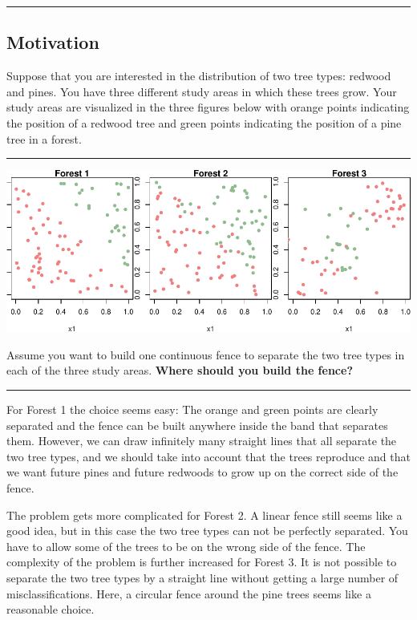 \documentclass[]{article}
\begin{document}
\begin{center}\rule{0.5\linewidth}{\linethickness}\end{center}

\hypertarget{motivation}{%
\subsection{Motivation}\label{motivation}}

Suppose that you are interested in the distribution of two tree types:
redwood and pines. You have three different study areas in which these
trees grow. Your study areas are visualized in the three figures below
with orange points indicating the position of a redwood tree and green
points indicating the position of a pine tree in a forest.

\begin{center}\rule{0.5\linewidth}{\linethickness}\end{center}

\includegraphics{9SVM_files/figure-latex/unnamed-chunk-1-1.pdf}

Assume you want to build one continuous fence to separate the two tree
types in each of the three study areas. \textbf{Where should you build
the fence?}

\begin{center}\rule{0.5\linewidth}{\linethickness}\end{center}

For Forest 1 the choice seems easy: The orange and green points are
clearly separated and the fence can be built anywhere inside the band
that separates them. However, we can draw infinitely many straight lines
that all separate the two tree types, and we should take into account
that the trees reproduce and that we want future pines and future
redwoods to grow up on the correct side of the fence.

The problem gets more complicated for Forest 2. A linear fence still
seems like a good idea, but in this case the two tree types can not be
perfectly separated. You have to allow some of the trees to be on the
wrong side of the fence. The complexity of the problem is further
increased for Forest 3. It is not possible to separate the two tree
types by a straight line without getting a large number of
misclassifications. Here, a circular fence around the pine trees seems
like a reasonable choice.
\end{document}
